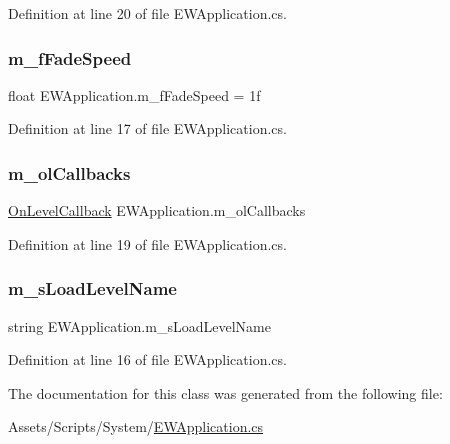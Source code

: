 Definition at line 20 of file E\+W\+Application.\+cs.

\mbox{\label{class_e_w_application_ac613173e21f3f946c7231f25ed9c2bda}} 
\subsubsection{\texorpdfstring{m\+\_\+f\+Fade\+Speed}{m\_fFadeSpeed}}
{\footnotesize\ttfamily float E\+W\+Application.\+m\+\_\+f\+Fade\+Speed = 1f}



Definition at line 17 of file E\+W\+Application.\+cs.

\mbox{\label{class_e_w_application_ab8e11eacf23e57a5d8540d0aa112eeaf}} 
\subsubsection{\texorpdfstring{m\+\_\+ol\+Callbacks}{m\_olCallbacks}}
{\footnotesize\ttfamily \mbox{\hyperlink{class_e_w_application_a8d1ecb5cea1da7551cad3891088b67b4}{On\+Level\+Callback}} E\+W\+Application.\+m\+\_\+ol\+Callbacks}



Definition at line 19 of file E\+W\+Application.\+cs.

\mbox{\label{class_e_w_application_a4a612f1850b3cf352582485b48f61def}} 
\subsubsection{\texorpdfstring{m\+\_\+s\+Load\+Level\+Name}{m\_sLoadLevelName}}
{\footnotesize\ttfamily string E\+W\+Application.\+m\+\_\+s\+Load\+Level\+Name}



Definition at line 16 of file E\+W\+Application.\+cs.



The documentation for this class was generated from the following file\+:\begin{DoxyCompactItemize}
\item 
Assets/\+Scripts/\+System/\mbox{\hyperlink{_e_w_application_8cs}{E\+W\+Application.\+cs}}\end{DoxyCompactItemize}
